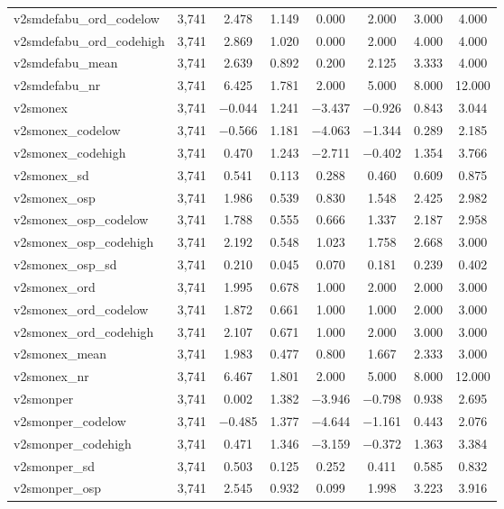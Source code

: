 \begin{table}[!htbp]
\begin{tabular}{@{\extracolsep{5pt}}lccccccc}
v2smdefabu\_ord\_codelow & 3,741 & 2.478 & 1.149 & 0.000 & 2.000 & 3.000 & 4.000 \\ 
v2smdefabu\_ord\_codehigh & 3,741 & 2.869 & 1.020 & 0.000 & 2.000 & 4.000 & 4.000 \\ 
v2smdefabu\_mean & 3,741 & 2.639 & 0.892 & 0.200 & 2.125 & 3.333 & 4.000 \\ 
v2smdefabu\_nr & 3,741 & 6.425 & 1.781 & 2.000 & 5.000 & 8.000 & 12.000 \\ 
v2smonex & 3,741 & $-$0.044 & 1.241 & $-$3.437 & $-$0.926 & 0.843 & 3.044 \\ 
v2smonex\_codelow & 3,741 & $-$0.566 & 1.181 & $-$4.063 & $-$1.344 & 0.289 & 2.185 \\ 
v2smonex\_codehigh & 3,741 & 0.470 & 1.243 & $-$2.711 & $-$0.402 & 1.354 & 3.766 \\ 
v2smonex\_sd & 3,741 & 0.541 & 0.113 & 0.288 & 0.460 & 0.609 & 0.875 \\ 
v2smonex\_osp & 3,741 & 1.986 & 0.539 & 0.830 & 1.548 & 2.425 & 2.982 \\ 
v2smonex\_osp\_codelow & 3,741 & 1.788 & 0.555 & 0.666 & 1.337 & 2.187 & 2.958 \\ 
v2smonex\_osp\_codehigh & 3,741 & 2.192 & 0.548 & 1.023 & 1.758 & 2.668 & 3.000 \\ 
v2smonex\_osp\_sd & 3,741 & 0.210 & 0.045 & 0.070 & 0.181 & 0.239 & 0.402 \\ 
v2smonex\_ord & 3,741 & 1.995 & 0.678 & 1.000 & 2.000 & 2.000 & 3.000 \\ 
v2smonex\_ord\_codelow & 3,741 & 1.872 & 0.661 & 1.000 & 1.000 & 2.000 & 3.000 \\ 
v2smonex\_ord\_codehigh & 3,741 & 2.107 & 0.671 & 1.000 & 2.000 & 3.000 & 3.000 \\ 
v2smonex\_mean & 3,741 & 1.983 & 0.477 & 0.800 & 1.667 & 2.333 & 3.000 \\ 
v2smonex\_nr & 3,741 & 6.467 & 1.801 & 2.000 & 5.000 & 8.000 & 12.000 \\ 
v2smonper & 3,741 & 0.002 & 1.382 & $-$3.946 & $-$0.798 & 0.938 & 2.695 \\ 
v2smonper\_codelow & 3,741 & $-$0.485 & 1.377 & $-$4.644 & $-$1.161 & 0.443 & 2.076 \\ 
v2smonper\_codehigh & 3,741 & 0.471 & 1.346 & $-$3.159 & $-$0.372 & 1.363 & 3.384 \\ 
v2smonper\_sd & 3,741 & 0.503 & 0.125 & 0.252 & 0.411 & 0.585 & 0.832 \\ 
v2smonper\_osp & 3,741 & 2.545 & 0.932 & 0.099 & 1.998 & 3.223 & 3.916 \\ 

\end{tabular}
\end{table}
